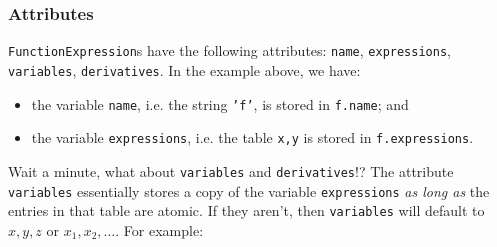\documentclass{article}
\begin{document}
\subsubsection*{Attributes}
\texttt{FunctionExpression}s have the following attributes: \texttt{name}, \texttt{expressions}, \texttt{variables}, \texttt{derivatives}. In the example above, we have:
\begin{itemize}
    \item the variable \texttt{name}, i.e. the string \texttt{'f'}, is stored in \texttt{f.name}; and
    \item the variable \texttt{expressions}, i.e. the table \texttt{{x,y}} is stored in \texttt{f.expressions}.
\end{itemize}
Wait a minute, what about \texttt{variables} and \texttt{derivatives}!? The attribute \texttt{variables} essentially stores a copy of the variable \texttt{expressions} \textit{as long as} the entries in that table are atomic. If they aren't, then \texttt{variables} will default to $x,y,z$ or $x_1,x_2,\ldots$. For example:
\end{document}
